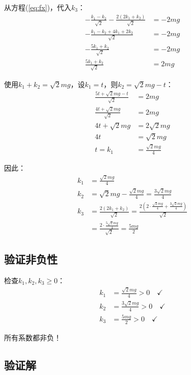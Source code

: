 \documentclass[12pt,a4paper]{article}
\begin{document}
从方程(\ref{eq:fx})，代入$k_3$：
\begin{align}
-\frac{k_1 - k_2}{\sqrt{2}} - \frac{2(2k_1 + k_2)}{\sqrt{2}} &= -2mg \\
-\frac{k_1 - k_2 + 4k_1 + 2k_2}{\sqrt{2}} &= -2mg \\
-\frac{5k_1 + k_2}{\sqrt{2}} &= -2mg \\
\frac{5k_1 + k_2}{\sqrt{2}} &= 2mg
\end{align}

使用$k_1 + k_2 = \sqrt{2}mg$，设$k_1 = t$，则$k_2 = \sqrt{2}mg - t$：
\begin{align}
\frac{5t + \sqrt{2}mg - t}{\sqrt{2}} &= 2mg \\
\frac{4t + \sqrt{2}mg}{\sqrt{2}} &= 2mg \\
4t + \sqrt{2}mg &= 2\sqrt{2}mg \\
4t &= \sqrt{2}mg \\
t = k_1 &= \frac{\sqrt{2}mg}{4}
\end{align}

因此：
\begin{align}
k_1 &= \frac{\sqrt{2}mg}{4} \\
k_2 &= \sqrt{2}mg - \frac{\sqrt{2}mg}{4} = \frac{3\sqrt{2}mg}{4} \\
k_3 &= \frac{2(2k_1 + k_2)}{\sqrt{2}} = \frac{2(2 \cdot \frac{\sqrt{2}mg}{4} + \frac{3\sqrt{2}mg}{4})}{\sqrt{2}} \\
&= \frac{2 \cdot \frac{5\sqrt{2}mg}{4}}{\sqrt{2}} = \frac{5mg}{2}
\end{align}

\subsection{验证非负性}

检查$k_1, k_2, k_3 \geq 0$：
\begin{align}
k_1 &= \frac{\sqrt{2}mg}{4} > 0 \quad \checkmark \\
k_2 &= \frac{3\sqrt{2}mg}{4} > 0 \quad \checkmark \\
k_3 &= \frac{5mg}{2} > 0 \quad \checkmark
\end{align}

所有系数都非负！

\subsection{验证解}
\end{document}
